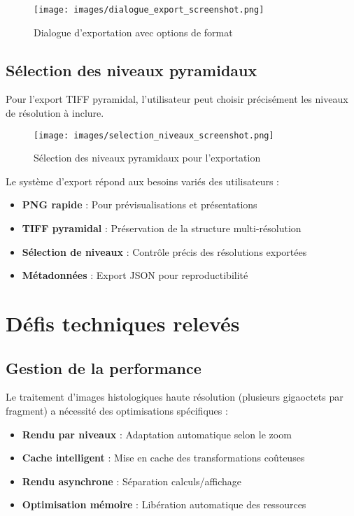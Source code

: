 \documentclass[11pt,a4paper]{report}
\begin{document}
\begin{figure}[htbp]
\centering
\texttt{[image: images/dialogue\_export\_screenshot.png]}
\caption{Dialogue d'exportation avec options de format}
\end{figure}

\subsection{Sélection des niveaux pyramidaux}

Pour l'export TIFF pyramidal, l'utilisateur peut choisir précisément les niveaux de résolution à inclure.

\begin{figure}[htbp]
\centering
\texttt{[image: images/selection\_niveaux\_screenshot.png]}
\caption{Sélection des niveaux pyramidaux pour l'exportation}
\end{figure}

Le système d'export répond aux besoins variés des utilisateurs :

\begin{itemize}
\item \textbf{PNG rapide} : Pour prévisualisations et présentations
\item \textbf{TIFF pyramidal} : Préservation de la structure multi-résolution
\item \textbf{Sélection de niveaux} : Contrôle précis des résolutions exportées
\item \textbf{Métadonnées} : Export JSON pour reproductibilité
\end{itemize}

\section{Défis techniques relevés}

\subsection{Gestion de la performance}

Le traitement d'images histologiques haute résolution (plusieurs gigaoctets par fragment) a nécessité des optimisations spécifiques :

\begin{itemize}
\item \textbf{Rendu par niveaux} : Adaptation automatique selon le zoom
\item \textbf{Cache intelligent} : Mise en cache des transformations coûteuses
\item \textbf{Rendu asynchrone} : Séparation calculs/affichage
\item \textbf{Optimisation mémoire} : Libération automatique des ressources
\end{itemize}
\end{document}
